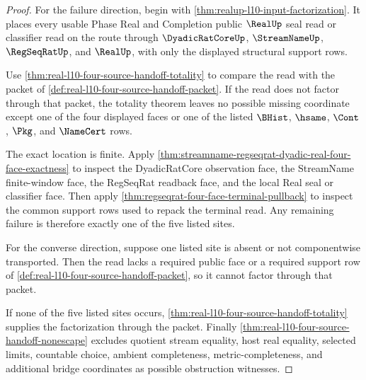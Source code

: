 \begin{proof}
For the failure direction, begin with \autoref{thm:realup-l10-input-factorization}. It places every usable Phase Real and Completion public $\RealUp$ seal read or classifier read on the route through $\DyadicRatCoreUp$, $\StreamNameUp$, $\RegSeqRatUp$, and $\RealUp$, with only the displayed structural support rows.

Use \autoref{thm:real-l10-four-source-handoff-totality} to compare the read with the packet of \autoref{def:real-l10-four-source-handoff-packet}. If the read does not factor through that packet, the totality theorem leaves no possible missing coordinate except one of the four displayed faces or one of the listed $\BHist$, $\hsame$, $\Cont$, $\Pkg$, and $\NameCert$ rows.

The exact location is finite. Apply \autoref{thm:streamname-regseqrat-dyadic-real-four-face-exactness} to inspect the DyadicRatCore observation face, the StreamName finite-window face, the RegSeqRat readback face, and the local Real seal or classifier face. Then apply \autoref{thm:regseqrat-four-face-terminal-pullback} to inspect the common support rows used to repack the terminal read. Any remaining failure is therefore exactly one of the five listed sites.

For the converse direction, suppose one listed site is absent or not componentwise transported. Then the read lacks a required public face or a required support row of \autoref{def:real-l10-four-source-handoff-packet}, so it cannot factor through that packet.

If none of the five listed sites occurs, \autoref{thm:real-l10-four-source-handoff-totality} supplies the factorization through the packet. Finally \autoref{thm:real-l10-four-source-handoff-nonescape} excludes quotient stream equality, host real equality, selected limits, countable choice, ambient completeness, metric-completeness, and additional bridge coordinates as possible obstruction witnesses.
\end{proof}

